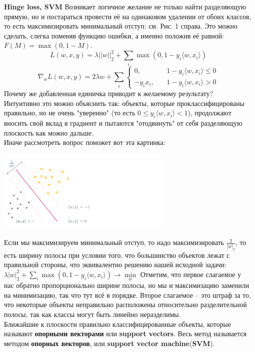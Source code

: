 \textbf{Hinge loss, SVM} Возникает логичное желание не только найти разделяющую прямую, но и постараться провести её на одинаковом удалении от обоих классов, то есть максимизировать минимальный отступ: см. Рис. 1 справа.
Это можно сделать, слегка поменяв функцию ошибки, а именно положив её равной:
$F(M) = \max(0, 1-M)$.
$$L(w, x, y) = \lambda||w||^2_2 + \sum_i \max(0, 1-y_i \langle w, x_i\rangle)$$
$$\nabla_w L(w, x, y) = 2 \lambda w + \sum_i
        \begin{cases} 
             0,      & \quad      1 - y_i \langle w, x_i \rangle \leq 0 \\ 
            - y_i x_i, & \quad   1 - y_i \langle w, x_i \rangle > 0
        \end{cases}$$ 
Почему же добавленная единичка приводит к желаемому результату? \\ Интуитивно это можно объяснить так: объекты, которые проклассифицированы правильно, но не очень "уверенно" (то есть $0 \leq y_i \langle w, x_i\rangle < 1$), продолжают вносить свой вклад в градиент и пытаются "отодвинуть" от себя разделяющую плоскость как можно дальше. \\
Иначе рассмотреть вопрос поможет вот эта картинка:
\begin{center}
    \includegraphics[height=4cm]{pics/t_osn24_5.png}
\end{center}
Если мы максимизируем минимальный отступ, то надо максимизировать $\frac{2}{|w|_2}$, то есть ширину полосы при условии того, что большинство объектов лежат с правильной стороны, что эквивалентно решению нашей исходной задачи:
$\lambda|w|^2_2 + \sum_i \max(0, 1-y_i \langle w, x_i\rangle) \longrightarrow\min\limits_{w}$
Отметим, что первое слагаемое у нас обратно пропорционально ширине полосы, но мы и максимизацию заменили на минимизацию, так что тут всё в порядке. Второе слагаемое – это штраф за то, что некоторые объекты неправильно расположены относительно разделительной полосы, так как классы могут быть линейно неразделимы. \\
Ближайшие к плоскости правильно классифицированные объекты, которые называют \textbf{опорными векторами} или \textbf{support vectors}. Весь метод называется методом \textbf{опорных векторов}, или \textbf{support vector machine}(\textbf{SVM}). 

